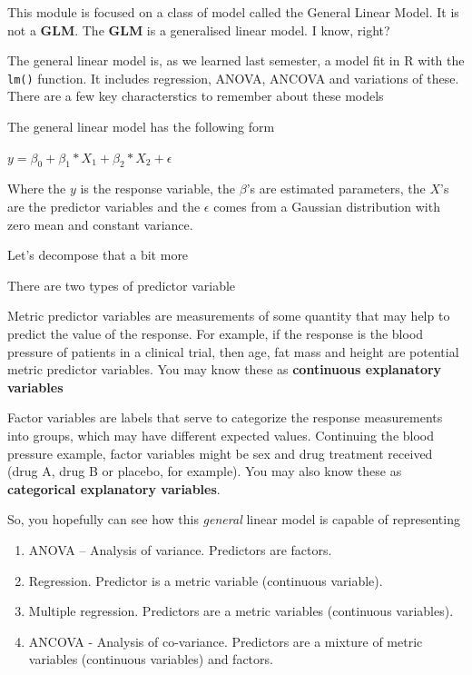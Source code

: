 \documentclass[
]{book}
\providecommand{\tightlist}{%
  \setlength{\itemsep}{0pt}\setlength{\parskip}{0pt}}
\begin{document}
This module is focused on a class of model called the General Linear Model. It is not a \textbf{GLM}. The \textbf{GLM} is a generalised linear model. I know, right?

The general linear model is, as we learned last semester, a model fit in R with the \texttt{lm()} function. It includes regression, ANOVA, ANCOVA and variations of these. There are a few key characterstics to remember about these models

The general linear model has the following form

\(y = \beta_{0}+\beta_{1}*X_{1}+\beta_{2}*X_{2}+\epsilon\)

Where the \(y\) is the response variable, the \(\beta\)'s are estimated parameters, the \(X\)'s are the predictor variables and the \(\epsilon\) comes from a Gaussian distribution with zero mean and constant variance.

Let's decompose that a bit more

There are two types of predictor variable

Metric predictor variables are measurements of some quantity that may help to predict the value of the response. For example, if the response is the blood pressure of patients in a clinical trial, then age, fat mass and height are potential metric predictor variables. You may know these as \textbf{continuous explanatory variables}

Factor variables are labels that serve to categorize the response measurements into groups, which may have different expected values. Continuing the blood pressure example, factor variables might be sex and drug treatment received (drug A, drug B or placebo, for example). You may also know these as \textbf{categorical explanatory variables}.

So, you hopefully can see how this \emph{general} linear model is capable of representing

\begin{enumerate}
\def\labelenumi{\arabic{enumi}.}
\tightlist
\item
  ANOVA -- Analysis of variance. Predictors are factors.
\item
  Regression. Predictor is a metric variable (continuous variable).\\
\item
  Multiple regression. Predictors are a metric variables (continuous variables).
\item
  ANCOVA - Analysis of co-variance. Predictors are a mixture of metric variables (continuous variables) and factors.
\end{enumerate}
\end{document}
